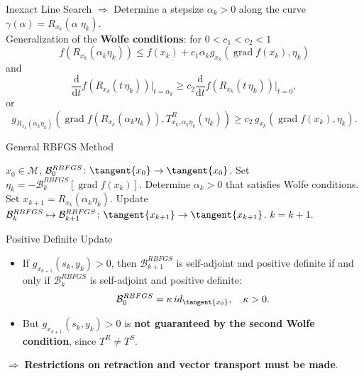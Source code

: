\documentclass[9pt]{beamer}
\begin{document}
\begin{frame}{Inexact Line Search}
    $\Rightarrow$ Determine a stepsize $\alpha_k > 0$ along the curve $\gamma(\alpha) = R_{x_k}(\alpha \; \eta_k)$. \\[0.3\baselineskip]
    Generalization of the \textbf{Wolfe conditions}: for $0 < c_1 < c_2 < 1$
    \begin{equation*}
        f( R_{x_k}(\alpha_k \eta_k)) \leq f(x_k) + c_1 \alpha_k g_{x_k} (\operatorname{grad} f(x_k), \eta_k)
    \end{equation*}
    and 
    \begin{equation*}
        \frac{\mathrm{d}}{\mathrm{d}t} f(R_{x_k}(t \, \eta_k)) \vert_{t=\alpha_k} \geq c_2 \frac{\mathrm{d}}{\mathrm{d}t} f(R_{x_k}(t \, \eta_k)) \vert_{t=0},
    \end{equation*}
    or 
    \begin{equation*}
        g_{R_{x_k}(\alpha_k \eta_k)} (\operatorname{grad} f(R_{x_k}(\alpha_k \eta_k)),  T^{R}_{x_k, \alpha_k \eta_k}(\eta_k)) \geq c_2 \, g_{x_k} (\operatorname{grad} f(x_k), \eta_k).
    \end{equation*}
\end{frame}

\begin{frame}{General RBFGS Method}
    \begin{algorithm}[H]
        \begin{algorithmic}[1]
            \State $x_0 \in \mathcal{M}$, $\mathcal{B}^{RBFGS}_0 \colon \tangent{x_0} \to \tangent{x_0}$.
            \State Set $\eta_k = - \mathcal{B}^{RBFGS}_k [\operatorname{grad} f(x_k)]$.
            \State Determine $\alpha_k > 0$ that satisfies Wolfe conditions. 
            \State Set $x_{k+1} = R_{x_k}(\alpha_k \eta_k)$.
            \State Update $\mathcal{B}^{RBFGS}_k \mapsto \mathcal{B}^{RBFGS}_{k+1} \colon \tangent{x_{k+1}} \to \tangent{x_{k+1}}$. 
            \State $k = k+1$.
        \EndWhile
        \end{algorithmic}
    \end{algorithm}
\end{frame}

\begin{frame}{Positive Definite Update}
    \begin{itemize}
        \item If $g_{x_{k+1}}(s_k, y_k) > 0$, then $\mathcal{B}^{RBFGS}_{k+1}$ is self-adjoint and positive definite if and only if $\mathcal{B}^{RBFGS}_k$ is self-adjoint and positive definite: \begin{equation*}\mathcal{B}^{RBFGS}_0 = \kappa \, id_{\tangent{x_0}}, \quad \kappa > 0.\end{equation*}
        \item But $g_{x_{k+1}}(s_k, y_k) > 0$ is \textbf{not guaranteed by the second Wolfe condition}, since $T^R \neq T^S$.
    \end{itemize}
    \vspace{9.5pt}
    $\Rightarrow$ \textbf{Restrictions on retraction and vector transport must be made}.
\end{frame}
\end{document}
